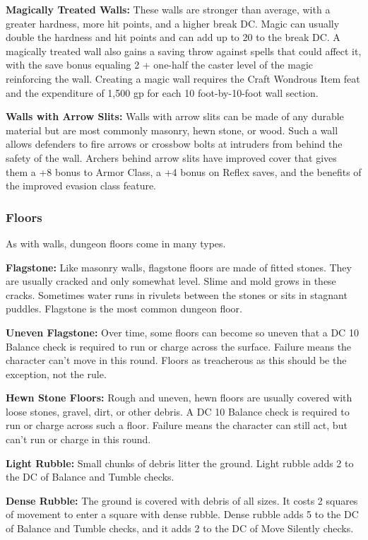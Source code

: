 \textbf{Magically Treated Walls:} These walls are stronger than average, 
with a greater hardness, more hit points, and a higher break DC. Magic can usually 
double the hardness and hit points and can add up to 20 to the break DC. A magically 
treated wall also gains a saving throw against spells that could affect it, with 
the save bonus equaling 2 + one-half the caster level of the magic reinforcing 
the wall. Creating a magic wall requires the Craft Wondrous Item feat and the expenditure 
of 1,500 gp for each 10 foot-by-10-foot wall section.

\textbf{Walls with Arrow Slits:} Walls with arrow slits can be made of any durable 
material but are most commonly masonry, hewn stone, or wood. Such a wall allows 
defenders to fire arrows or crossbow bolts at intruders from behind the safety 
of the wall. Archers behind arrow slits have improved cover that gives them a +8 
bonus to Armor Class, a +4 bonus on Reflex saves, and the benefits of the improved 
evasion class feature.

\subsubsection{Floors}

As with walls, dungeon floors come in many types.

\textbf{Flagstone:} Like masonry walls, flagstone floors are made of fitted stones. 
They are usually cracked and only somewhat level. Slime and mold grows in these 
cracks. Sometimes water runs in rivulets between the stones or sits in stagnant 
puddles. Flagstone is the most common dungeon floor.

\textbf{Uneven Flagstone:} Over time, some floors can become so uneven that a DC 
10 Balance check is required to run or charge across the surface. Failure means 
the character can't move in this round. Floors as treacherous as this should be 
the exception, not the rule.

\textbf{Hewn Stone Floors:} Rough and uneven, hewn floors are usually covered with 
loose stones, gravel, dirt, or other debris. A DC 10 Balance check is required 
to run or charge across such a floor. Failure means the character can still act, 
but can't run or charge in this round.

\textbf{Light Rubble:} Small chunks of debris litter the ground. Light rubble adds 
2 to the DC of Balance and Tumble checks.

\textbf{Dense Rubble:} The ground is covered with debris of all sizes. It costs 
2 squares of movement to enter a square with dense rubble. Dense rubble adds 5 
to the DC of Balance and Tumble checks, and it adds 2 to the DC of Move Silently 
checks.


